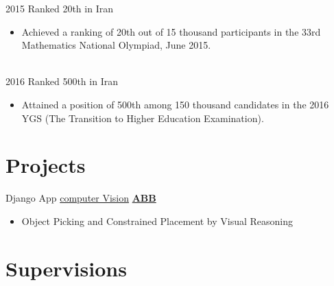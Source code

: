 \documentclass[letterpaper]{DS_class_file} %
\begin{document}
\begin{twenty} %
	\twentyitem
	{2015}
	{}
	{\hspace{0.3cm}Ranked 20th in Iran}
	{}
	{}
	{
		{\begin{itemize}
				\item Achieved a ranking of 20th out of 15 thousand participants in the 33rd Mathematics National Olympiad, June 2015.
		\end{itemize}}
	}
	\\
	\twentyitem
	{2016}
	{}
	{\hspace{0.3cm}Ranked 500th in Iran}
	{}
	{}
	{\begin{itemize}
			\item Attained a position of 500th among 150 thousand candidates in the 2016 YGS (The Transition to Higher Education Examination).    
   
	\end{itemize}}

\end{twenty}


\makeseconda %

\section{Projects}

\begin{twenty} %
    
	\twentyitem
	{Django}
	{App}
	{\hspace{0.3cm}\href{}{computer Vision}}
	{\href{https://new.abb.com/se}{\textbf{ABB}}}
	{}
	{
		{\begin{itemize}
				\item Object Picking and Constrained Placement by Visual Reasoning
		\end{itemize}}
	}
	
\end{twenty}


\section{Supervisions}
\end{document}
